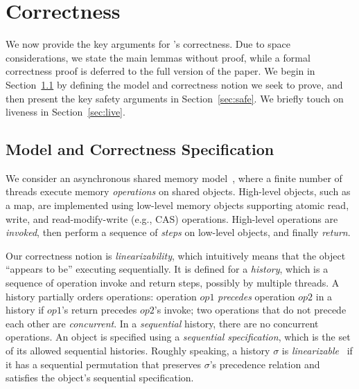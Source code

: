 \newcommand{\lp}[1]{LP(\ensuremath{#1})}

\section{Correctness}
\label{sec:proof}

We now provide the key arguments for \kiwi's correctness. 
Due to space considerations, we state the main lemmas without proof, while 
a formal correctness proof is deferred to the full version of the paper.
We begin in Section~\ref{sec:spec} by defining the model and correctness notion we seek to prove, and then present  
the key safety arguments in Section~\ref{sec:safe}. We briefly touch on liveness in Section~\ref{sec:live}.

\subsection{Model and Correctness Specification}
\label{sec:spec}

We consider an asynchronous shared memory model~\cite{Welch2004}, where a finite number of threads execute memory \emph{operations} on shared objects. High-level objects, such as a map, are implemented using low-level memory objects supporting atomic read, write, and read-modify-write (e.g., CAS) operations. 
High-level operations are \emph{invoked}, then perform a sequence of  \emph{steps} on low-level objects, and finally \emph{return}.

Our correctness notion is \emph{linearizability}, which intuitively means that the object ``appears to be'' executing sequentially. 
It is defined for a \emph{history}, which is a sequence of operation invoke and return steps, possibly by multiple threads.
A history partially orders operations: 
operation $op1$ \emph{precedes} operation $op2$ in a history if $op1$'s return precedes $op2$'s invoke;
two operations that do not precede each other are \emph{concurrent}. In a  \emph{sequential} history, there are no concurrent operations.
An object is specified using a \emph{sequential specification}, which is the set of its allowed sequential histories. 
Roughly speaking, a history $\sigma$ is \emph{linearizable}~\cite{HerlihyW1990} if it has a sequential permutation that preserves 
$\sigma$'s precedence relation and satisfies the object's sequential specification. 


